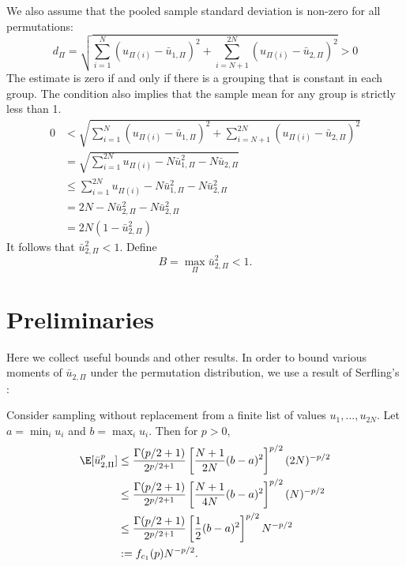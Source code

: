 We also assume that the pooled sample standard deviation is non-zero for all permutations:
\begin{equation}
  \label{A:non-zero-std-dev}
  d_\Pi = \sqrt{\sum_{i=1}^N(u_{\Pi(i)} - \bar{u}_{1,\Pi})^2 + \sum_{i=N+1}^{2N}(u_{\Pi(i)} -
    \bar{u}_{2,\Pi})^2} > 0
\end{equation}
The estimate is zero if and only if there is a grouping that is constant in each group.  The
condition also implies that the sample mean for any group is strictly less than 1.
\begin{align*}
  0 &< \sqrt{\sum_{i=1}^N(u_{\Pi(i)} - \bar{u}_{1,\Pi})^2 + \sum_{i=N+1}^{2N}(u_{\Pi(i)} -
    \bar{u}_{2,\Pi})^2} \\
  &= \sqrt{\sum_{i=1}^{2N} u_{\Pi(i)} - N \bar{u}_{1,\Pi}^2 - N \bar{u}_{2,\Pi}} \\
  &\leq \sum_{i=1}^{2N} u_{\Pi(i)} - N \bar{u}_{1,\Pi}^2 - N \bar{u}_{2,\Pi}^2 \\
  &= 2N - N \bar{u}_{2,\Pi}^2 - N \bar{u}_{2,\Pi}^2 \\
  &= 2N(1 - \bar{u}_{2,\Pi}^2)
\end{align*}
It follows that $\bar{u}_{2,\Pi}^2 < 1$.  Define
\begin{equation}
  \label{A:B}
  B = \max_\Pi \bar{u}_{2,\Pi}^2 < 1.
\end{equation}

\section{Preliminaries}
Here we collect useful bounds and other results.  In order to bound various moments of
$\bar{u}_{2,\Pi}$ under the permutation distribution, we use a result of Serfling's
\cite{serfling1974probability}:
\begin{proposition}
  Consider sampling without replacement from a finite list of values
  $u_1, \ldots, u_{2N}$.  Let $a = \min_i u_{i}$ and $b = \max_i u_{i}$.
  Then for $p > 0$,
  \begin{align}
    \E [\bar{u}_{2,\Pi}^p] 
    &\leq \frac{\Gamma(p/2 + 1)}{2^{p/2 + 1}}
    \left [ \frac{N+1}{2N}(b-a)^2 \right ]^{p/2}
    (2N)^{-p/2} \nonumber \\
    &\leq \frac{\Gamma(p/2 + 1)}{2^{p/2 + 1}}
    \left [ \frac{N+1}{4N}(b-a)^2 \right ]^{p/2}
    (N)^{-p/2} \nonumber \\
    &\leq \frac{\Gamma(p/2 + 1)}{2^{p/2 + 1}}
    \left [ \frac{1}{2}(b-a)^2 \right ]^{p/2}
    N^{-p/2} \nonumber \\
    &:= f_{c_1}(p)N^{-p/2} \label{def:serfling}.
  \end{align}
\end{proposition}

